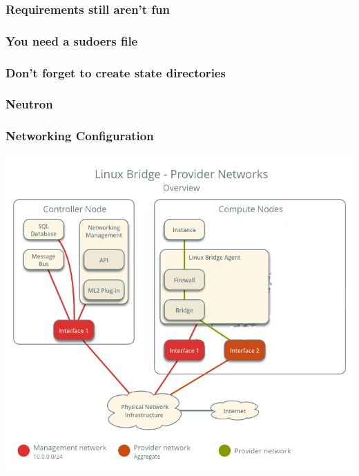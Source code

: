 \documentclass[aspectratio=169,11pt,hyperref={colorlinks=true}]{beamer}
\begin{document}
\begin{frame}
    \frametitle{Requirements still aren't fun}
    
\end{frame}

\begin{frame}
    \frametitle{You need a  sudoers file}
    
\end{frame}

\begin{frame}
    \frametitle{Don't forget to create state directories}
    
\end{frame}

\subsubsection{Neutron}
\begin{frame}
    \frametitle{Networking Configuration}
    \centering
    \includegraphics[width=.7\textwidth]{network-topology.png}
\end{frame}
\end{document}
